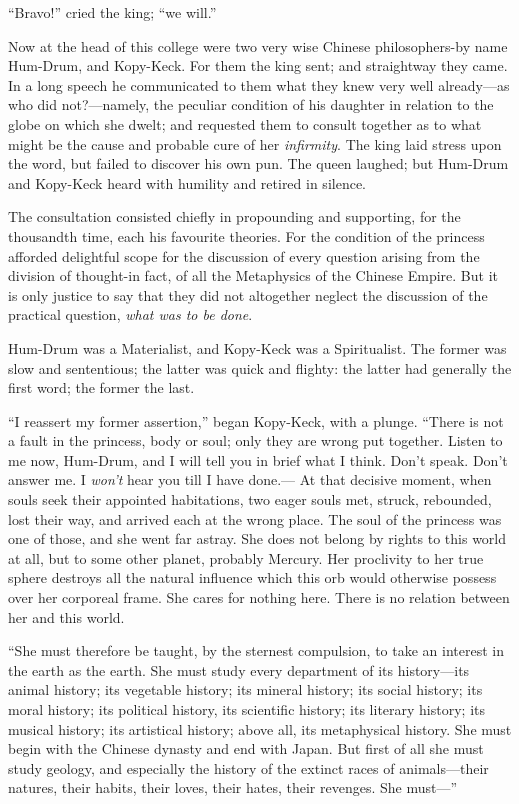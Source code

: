 \documentclass[12pt]{memoir}
\begin{document}
``Bravo!'' cried the king; ``we will.''

Now at the head of this college were two very wise Chinese
philosophers-by name Hum-Drum, and Kopy-Keck.  For them the king
sent; and straightway they came.  In a long speech he communicated
to them what they knew very well already---as who did not?---namely,
the peculiar condition of his daughter in relation to the globe on
which she dwelt; and requested them to consult together as to what
might be the cause and probable cure of her \emph{infirmity}.  The king
laid stress upon the word, but failed to discover his own pun.  The
queen laughed; but Hum-Drum and Kopy-Keck heard with humility and
retired in silence.

The consultation consisted chiefly in propounding and supporting,
for the thousandth time, each his favourite theories.  For the
condition of the princess afforded delightful scope for the
discussion of every question arising from the division of
thought-in fact, of all the Metaphysics of the Chinese Empire.  But
it is only justice to say that they did not altogether neglect the
discussion of the practical question, \emph{what was to be done}.

Hum-Drum was a Materialist, and Kopy-Keck was a Spiritualist.  The
former was slow and sententious; the latter was quick and flighty:
the latter had generally the first word; the former the last.

``I reassert my former assertion,'' began Kopy-Keck, with a plunge.
``There is not a fault in the princess, body or soul; only they are
wrong put together.  Listen to me now, Hum-Drum, and I will tell you
in brief what I think.  Don't speak.  Don't answer me.  I \emph{won't}
hear you till I have done.--- At that decisive moment, when souls seek
their appointed habitations, two eager souls met, struck, rebounded,
lost their way, and arrived each at the wrong place.  The soul of the
princess was one of those, and she went far astray.  She does not
belong by rights to this world at all, but to some other planet,
probably Mercury.  Her proclivity to her true sphere destroys all the
natural influence which this orb would otherwise possess over her
corporeal frame.  She cares for nothing here.  There is no relation
between her and this world.

``She must therefore be taught, by the sternest compulsion, to take an
interest in the earth as the earth.  She must study every department
of its history---its animal history; its vegetable history; its
mineral history; its social history; its moral history; its political
history, its scientific history; its literary history; its musical
history; its artistical history; above all, its metaphysical history.
She must begin with the Chinese dynasty and end with Japan.  But first
of all she must study geology, and especially the history of the
extinct races of animals---their natures, their habits, their loves,
their hates, their revenges.  She must---''
\end{document}
